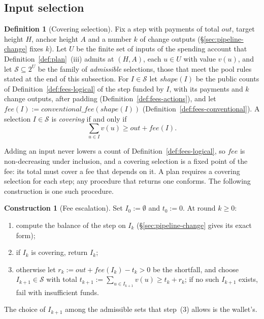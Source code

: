 \documentclass[11pt,a4paper]{article}
\theoremstyle{definition}
\newtheorem{definition}[theorem]{Definition}
\newtheorem{construction}[theorem]{Construction}
\begin{document}
\subsection{Input selection}\label{sec:pipeline-selection}

\begin{definition}[Covering selection]\label{def:sel-covering}
Fix a step with payments of total $\mathit{out}$, target height $H$, anchor
height $A$ and a number $k$ of change outputs
(\S\ref{sec:pipeline-change} fixes $k$). Let $U$ be the finite set of
inputs of the spending account that Definition~\ref{def:plan}~(iii) admits
at $(H, A)$, each $u \in U$ with value $v(u)$, and let
$\mathcal{S} \subseteq 2^{U}$ be the family of \emph{admissible}
selections, those that meet the pool rules stated at the end of this
subsection. For $I \in \mathcal{S}$ let $\mathit{shape}(I)$ be the public
counts of Definition~\ref{def:fees-logical} of the step funded by $I$, with
its payments and $k$ change outputs, after padding
(Definition~\ref{def:fees-actions}), and let
$\mathit{fee}(I) := \mathit{conventional\_fee}(\mathit{shape}(I))$
(Definition~\ref{def:fees-conventional}). A selection $I \in \mathcal{S}$ is
\emph{covering} if and only if
\[
  \textstyle\sum_{u \in I} v(u) \ge \mathit{out} + \mathit{fee}(I).
\]
\end{definition}

Adding an input never lowers a count of Definition~\ref{def:fees-logical},
so $\mathit{fee}$ is non-decreasing under inclusion, and a covering
selection is a fixed point of the fee: its total must cover a fee that
depends on it. A plan requires a covering selection for each step; any
procedure that returns one conforms. The following construction is one such
procedure.

\begin{construction}[Fee escalation]\label{def:sel-escalation}
Set $I_0 := \emptyset$ and $t_0 := 0$. At round $k \ge 0$:
\begin{enumerate}[label=(\arabic*)]
\item compute the balance of the step on $I_k$
  (\S\ref{sec:pipeline-change} gives its exact form);
\item if $I_k$ is covering, return $I_k$;
\item otherwise let $r_k := \mathit{out} + \mathit{fee}(I_k) - t_k > 0$ be
  the shortfall, and choose $I_{k+1} \in \mathcal{S}$ with total
  $t_{k+1} := \sum_{u \in I_{k+1}} v(u) \ge t_k + r_k$; if no such
  $I_{k+1}$ exists, fail with insufficient funds.
\end{enumerate}
The choice of $I_{k+1}$ among the admissible sets that step~(3) allows is
the wallet's.
\end{construction}
\end{document}

